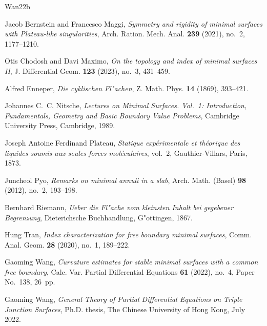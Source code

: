 \documentclass[11pt,twoside]{amsart}
\numberwithin{equation}{section}
\begin{document}

%

\providecommand{\bysame}{\leavevmode\hbox to3em{\hrulefill}\thinspace}
\providecommand{\MR}{\relax\ifhmode\unskip\space\fi MR }
\providecommand{\MRhref}[2]{%
  \href{http://www.ams.org/mathscinet-getitem?mr=#1}{#2}
}
\providecommand{\href}[2]{#2}
\begin{thebibliography}{Wan22b}

Jacob Bernstein and Francesco Maggi,
\emph{Symmetry and rigidity of minimal surfaces with Plateau-like singularities},
Arch. Ration. Mech. Anal. \textbf{239} (2021), no.~2, 1177--1210.

Otis Chodosh and Davi Maximo,
\emph{On the topology and index of minimal surfaces II},
J. Differential Geom. \textbf{123} (2023), no.~3, 431--459.

Alfred Enneper,
\emph{Die cyklischen Fl{"a}chen},
Z. Math. Phys. \textbf{14} (1869), 393--421.

Johannes C.~C. Nitsche,
\emph{Lectures on Minimal Surfaces. Vol.~1: Introduction, Fundamentals, Geometry and Basic Boundary Value Problems},
Cambridge University Press, Cambridge, 1989.

Joseph Antoine Ferdinand Plateau,
\emph{Statique exp{\'e}rimentale et th{\'e}orique des liquides soumis aux seules forces mol{\'e}culaires},
vol.~2, Gauthier-Villars, Paris, 1873.

Juncheol Pyo,
\emph{Remarks on minimal annuli in a slab},
Arch. Math. (Basel) \textbf{98} (2012), no.~2, 193--198.

Bernhard Riemann,
\emph{Ueber die Fl{"a}che vom kleinsten Inhalt bei gegebener Begrenzung},
Dieterichsche Buchhandlung, G{"o}ttingen, 1867.

Hung Tran,
\emph{Index characterization for free boundary minimal surfaces},
Comm. Anal. Geom. \textbf{28} (2020), no.~1, 189--222.

Gaoming Wang,
\emph{Curvature estimates for stable minimal surfaces with a common free boundary},
Calc. Var. Partial Differential Equations \textbf{61} (2022), no.~4, Paper No.~138, 26~pp.

Gaoming Wang,
\emph{General Theory of Partial Differential Equations on Triple Junction Surfaces},
Ph.D. thesis, The Chinese University of Hong Kong, July 2022.

\end{thebibliography}
\end{document}
